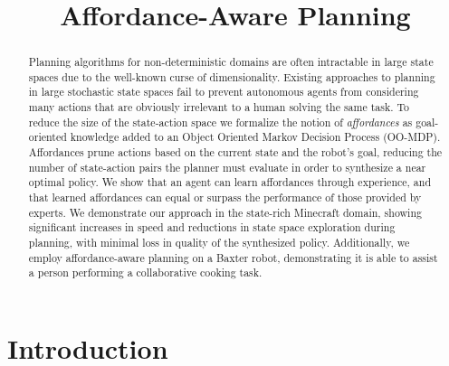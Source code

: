 \documentclass[letterpaper]{article}
\begin{document}
\title{Affordance-Aware Planning}


\maketitle

\begin{abstract}
Planning algorithms for non-deterministic domains are often
intractable in large state spaces due to the well-known curse of
dimensionality. Existing approaches to planning in large stochastic
state spaces fail to prevent autonomous agents from considering many
actions that are obviously irrelevant to a human solving the same
task. To reduce the size of the state-action space
we formalize the notion of {\em affordances} as
goal-oriented knowledge added to an Object Oriented Markov Decision
Process (OO-MDP).  Affordances prune actions based on the current
state and the robot's goal, reducing the number of state-action pairs
the planner must evaluate in order to synthesize a near optimal
policy. We show that an agent can learn affordances through
experience, and that learned affordances can equal or surpass the
performance of those provided by experts.
We demonstrate our approach in the state-rich Minecraft domain, showing significant increases in
speed and reductions in state space exploration during planning, with
minimal loss in quality of the synthesized policy.  Additionally, we
employ affordance-aware planning on a Baxter robot, demonstrating it
is able to assist a person performing a collaborative cooking task.
\end{abstract}



\section{Introduction}
\label{sec:introduction}
\end{document}
